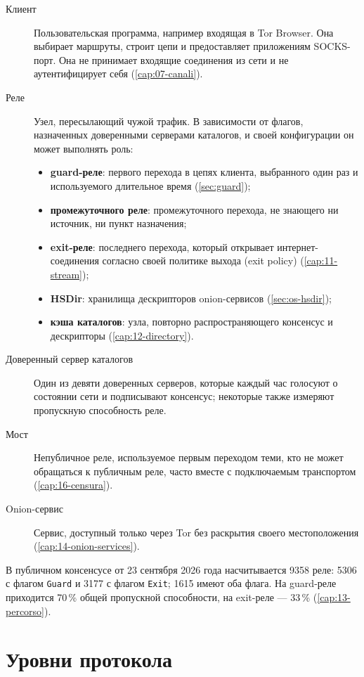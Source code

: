 \begin{description}
  \item[Клиент] Пользовательская программа, например входящая в Tor Browser. Она выбирает маршруты, строит цепи и предоставляет приложениям SOCKS-порт. Она не принимает входящие соединения из сети и не аутентифицирует себя (\cref{cap:07-canali}).
  \item[Реле] Узел, пересылающий чужой трафик. В зависимости от флагов, назначенных доверенными серверами каталогов, и своей конфигурации он может выполнять роль:
  \begin{itemize}
    \item \textbf{guard-реле}: первого перехода в цепях клиента, выбранного один раз и используемого длительное время (\cref{sec:guard});
    \item \textbf{промежуточного реле}: промежуточного перехода, не знающего ни источник, ни пункт назначения;
    \item \textbf{exit-реле}: последнего перехода, который открывает интернет-соединения согласно своей политике выхода (exit policy) (\cref{cap:11-stream});
    \item \textbf{HSDir}: хранилища дескрипторов onion-сервисов (\cref{sec:os-hsdir});
    \item \textbf{кэша каталогов}: узла, повторно распространяющего консенсус и дескрипторы (\cref{cap:12-directory}).
  \end{itemize}
  \item[Доверенный сервер каталогов] Один из девяти доверенных серверов, которые каждый час голосуют о состоянии сети и подписывают консенсус; некоторые также измеряют пропускную способность реле.
  \item[Мост] Непубличное реле, используемое первым переходом теми, кто не может обращаться к публичным реле, часто вместе с подключаемым транспортом (\cref{cap:16-censura}).
  \item[Onion-сервис] Сервис, доступный только через Tor без раскрытия своего местоположения (\cref{cap:14-onion-services}).
\end{description}

В публичном консенсусе от 23 сентября 2026 года насчитывается 9358 реле: 5306 с флагом \texttt{Guard} и 3177 с флагом \texttt{Exit}; 1615 имеют оба флага. На guard-реле приходится 70\,\% общей пропускной способности, на exit-реле --- 33\,\% (\cref{cap:13-percorso}).

\section{Уровни протокола}\label{sec:arch-livelli}

